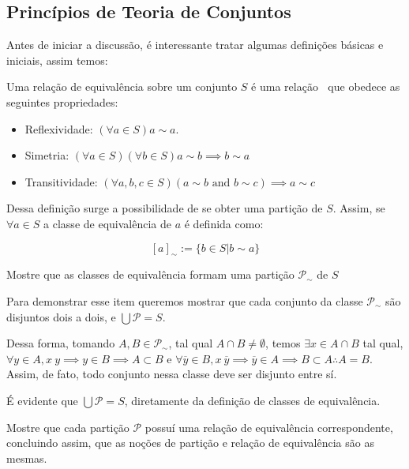 \documentclass[../main]{subfiles}
\begin{document}
\subsection{Princípios de Teoria de Conjuntos}
Antes de iniciar a discussão, é interessante tratar algumas definições básicas e
iniciais, assim temos:

\begin{definition}
    Uma relação de equivalência sobre um conjunto \(S\) é uma relação \(~\) que
    obedece as seguintes propriedades:

    \begin{itemize}
        \item Reflexividade: \((\forall a \in S) a \sim a\).
        \item Simetria: \((\forall a \in S) (\forall b \in S) a \sim b \implies
        b \sim a\)
        \item Transitividade: \((\forall a, b, c \in S)(a \sim b \text{ and } b
        \sim c) \implies a \sim c\)
\end{itemize}
\end{definition}
Dessa definição surge a possibilidade de se obter uma partição de \(S\). Assim,
se \(\forall a \in S \) a classe de equivalência de \(a\) é definida como:

\[[a]_\sim := \{b \in S | b \sim a\} \]

\begin{exercise} 
    Mostre que as classes de equivalência formam uma partição \(\mathcal P_\sim
    \) de \(S\)
\end{exercise}
\begin{answer}
    Para demonstrar esse item queremos mostrar que cada conjunto da classe
    \(\mathcal P_\sim \) são disjuntos dois a dois, e \(\bigcup \mathcal P =
    S\).
    
    Dessa forma, tomando \(A, B \in \mathcal P_\sim \), tal qual \(A \cap B \neq
    \emptyset \), temos \(\exists x \in A \cap B\) tal qual, \(\forall y \in A,
    x ~ y \implies y \in B \implies A \subset B\) e \(\forall \overline y \in B,
    x ~ \overline y \implies \overline y \in A \implies B \subset A \therefore A
    = B\). Assim, de fato, todo conjunto nessa classe deve ser disjunto entre
    sí. 
    
    É evidente que \(\bigcup \mathcal P = S\), diretamente da definição de
    classes de equivalência. 
\end{answer}
\begin{exercise}
    Mostre que cada partição \(\mathcal P\) possuí uma relação de equivalência
    correspondente, concluindo assim, que as noções de partição e relação de
    equivalência são as mesmas.
\end{exercise}
\end{document}
